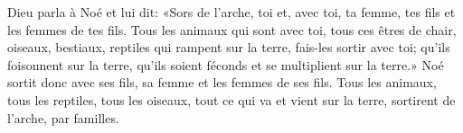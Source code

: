 Dieu parla à Noé et lui dit:
	«Sors de l’arche, toi et, avec toi, ta femme,
	tes fils et les femmes de tes fils.
Tous les animaux qui sont avec toi, tous ces êtres de chair,
	oiseaux, bestiaux, reptiles qui rampent sur la terre,
	fais-les sortir avec toi;
	qu’ils foisonnent sur la terre,
	qu’ils soient féconds et se multiplient sur la terre.»
Noé sortit donc avec ses fils, sa femme et les femmes de ses fils.
Tous les animaux, tous les reptiles, tous les oiseaux,
	tout ce qui va et vient sur la terre, sortirent de l’arche, par familles.
